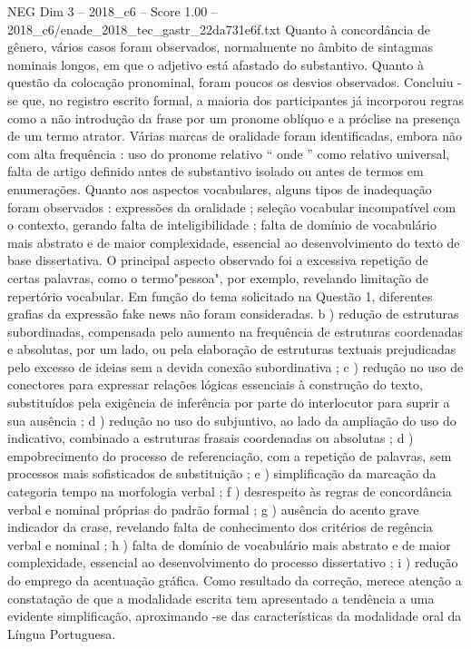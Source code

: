 \begin{textsample}{NEG Dim 3 – 2018\_c6 – Score 1.00 – 2018\_c6/enade\_2018\_tec\_gastr\_22da731e6f.txt}
Quanto à concordância de gênero, vários casos foram observados, normalmente no âmbito de sintagmas nominais longos, em que o adjetivo está afastado do substantivo.
Quanto à questão da colocação pronominal, foram poucos os desvios observados.
Concluiu -se que, no registro escrito formal, a maioria dos participantes já incorporou regras como a não introdução da frase por um pronome oblíquo e a próclise na presença de um termo atrator.
Várias marcas de oralidade foram identificadas, embora não com alta frequência : uso do pronome relativo “ onde ” como relativo universal, falta de artigo definido antes de substantivo isolado ou antes de termos em enumerações.
Quanto aos aspectos vocabulares, alguns tipos de inadequação foram observados : expressões da oralidade ; seleção vocabular incompatível com o contexto, gerando falta de inteligibilidade ; falta de domínio de vocabulário mais abstrato e de maior complexidade, essencial ao desenvolvimento do texto de base dissertativa.
O principal aspecto observado foi a excessiva repetição de certas palavras, como o termo"pessoa", por exemplo, revelando limitação de repertório vocabular.
Em função do tema solicitado na Questão 1, diferentes grafias da expressão fake news não foram consideradas. b ) redução de estruturas subordinadas, compensada pelo aumento na frequência de estruturas coordenadas e absolutas, por um lado, ou pela elaboração de estruturas textuais prejudicadas pelo excesso de ideias sem a devida conexão subordinativa ; c ) redução no uso de conectores para expressar relações lógicas essenciais à construção do texto, substituídos pela exigência de inferência por parte do interlocutor para suprir a sua ausência ; d ) redução no uso do subjuntivo, ao lado da ampliação do uso do indicativo, combinado a estruturas frasais coordenadas ou absolutas ; d ) empobrecimento do processo de referenciação, com a repetição de palavras, sem processos mais sofisticados de substituição ; e ) simplificação da marcação da categoria tempo na morfologia verbal ; f ) desrespeito às regras de concordância verbal e nominal próprias do padrão formal ; g ) ausência do acento grave indicador da crase, revelando falta de conhecimento dos critérios de regência verbal e nominal ; h ) falta de domínio de vocabulário mais abstrato e de maior complexidade, essencial ao desenvolvimento do processo dissertativo ; i ) redução do emprego da acentuação gráfica.
Como resultado da correção, merece atenção a constatação de que a modalidade escrita tem apresentado a tendência a uma evidente simplificação, aproximando -se das características da modalidade oral da Língua Portuguesa.

\end{textsample}
